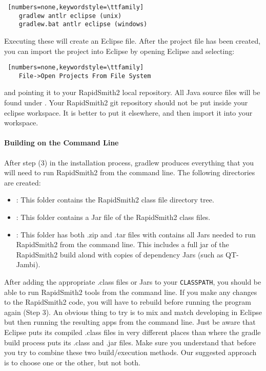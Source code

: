\begin{enumerate}
\begin{lstlisting} [numbers=none,keywordstyle=\ttfamily]
	gradlew antlr eclipse (unix)       
	gradlew.bat antlr eclipse (windows)
\end{lstlisting}
  
  Executing these will create an Eclipse  file. After the project
  file has been created, you can import the project into Eclipse by opening
  Eclipse and selecting:
  
\begin{lstlisting} [numbers=none,keywordstyle=\ttfamily]
	File->Open Projects From File System 
\end{lstlisting}
  
  and pointing it to your RapidSmith2 local repository. All Java source files
  will be found under .  Your RapidSmith2 git repository
  should not be put inside your eclipse workspace. It is better to put it
  elsewhere, and then import it into your workspace.
  \paragraph{Building on the Command Line} After step (3) in the installation
  process, gradlew produces everything that you will need to run RapidSmith2 from the
  command line. The following directories are created: 
  \begin{itemize}
    \item {}: This folder contains the RapidSmith2 class file
    directory tree.
    \item {}: This folder contains a Jar file of the RapidSmith2 class
    files.
    \item {}: This folder has both .zip and .tar files
    with contains all Jars needed to run RapidSmith2 from the command line. This
    includes a full jar of the RapidSmith2 build alond with copies of dependency Jars
    (such as QT-Jambi).
  \end{itemize} 
  After adding the appropriate .class files or Jars to your \texttt{CLASSPATH},
  you should be able to run RapidSmith2 tools from the command line. If you make any
  changes to the RapidSmith2 code, you will have to rebuild before running the program
  again (Step 3).  An obvious thing to try is to mix and match
  developing in Eclipse but then running the resulting apps from the command
  line. Just be aware that Eclipse puts its compiled .class files in very
  different places than where the gradle build process puts its .class and
  .jar files. Make sure you understand that before you try to combine these two
  build/execution methods. Our suggested approach is to choose one or the
  other, but not both.
\end{enumerate}

